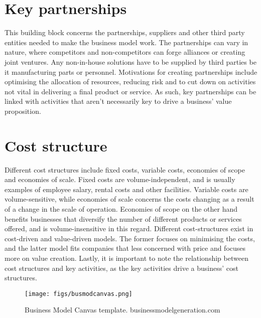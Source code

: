 \section{Key partnerships}
This building block concerns the partnerships, suppliers and other third party entities needed to make the business model work. The partnerships can vary in nature, where competitors and non-competitors can forge alliances or creating joint ventures. Any non-in-house solutions have to be supplied by third parties be it manufacturing parts or personnel. Motivations for creating partnerships include optimising the allocation of resources, reducing risk and to cut down on activities not vital in delivering a final product or service. As such, key partnerships can be linked with activities that aren't necessarily key to drive a business' value proposition. 

\section{Cost structure}
Different cost structures include fixed costs, variable costs, economies of scope and economies of scale. Fixed costs are volume-independent, and is usually examples of employee salary, rental costs and other facilities. Variable costs are volume-sensitive, while economies of scale concerns the costs changing as a result of a change in the scale of operation. Economies of scope on the other hand benefits businesses that diversify the number of different products or services offered, and is volume-insensitive in this regard. Different cost-structures exist in cost-driven and value-driven models. The former focuses on minimising the costs, and the latter model fits companies that less concerned with price and focuses more on value creation.
Lastly, it is important to note the relationship between cost structures and key activities, as the key activities drive a business' cost structures. 

\begin{figure}[]
    \centering
    \texttt{[image: figs/busmodcanvas.png]}
    \caption{Business Model Canvas template. \textcopyright businessmodelgeneration.com}
    \label{fig:businessmodelcanvas}
\end{figure}